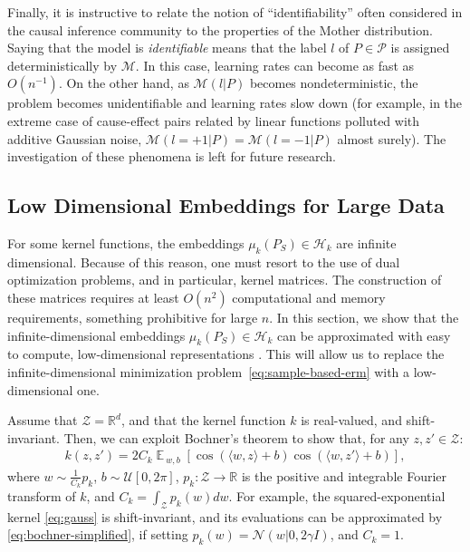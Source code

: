 \documentclass{article}
\DeclareMathOperator*{\E}{\mathbb{E}\,}
\renewcommand{\P}{\mathcal{P}}
\renewcommand{\H}{\mathcal{H}}
\newcommand{\U}{\mathcal{U}}
\newcommand{\M}{\mathscr{M}}
\newcommand{\Z}{\mathcal{Z}}
\newcommand{\N}{\mathcal{N}}
\newcommand{\R}{\mathbb{R}}
\begin{document}
Finally, it is instructive to relate the notion of ``identifiability'' often
considered in the causal inference community \citep{Pearl00} to the properties
of the Mother distribution.  Saying that the model is \emph{identifiable} means
that the label $l$ of $P\in\P$ is assigned deterministically by $\M$.  In this
case, learning rates can become as fast as $O(n^{-1})$.  On the other hand, as
$\M(l|P)$ becomes nondeterministic, the problem becomes unidentifiable and
learning rates slow down (for example, in the extreme case of cause-effect pairs related
by linear functions polluted with additive Gaussian noise, $\M(l=+1|P) =
\M(l=-1|P)$ almost surely). The investigation of these phenomena is left
for future research.

\subsection{Low Dimensional Embeddings for Large Data}\label{sec:random}

For some kernel functions, the embeddings $\mu_k(P_S)\in\H_k$
are infinite dimensional.  Because of this reason, one must resort to the use
of dual optimization problems, and in particular, kernel matrices.  The
construction of these matrices requires at least $O(n^2)$ computational and
memory requirements, something prohibitive for large $n$.  In this section, we
show that the infinite-dimensional embeddings $\mu_k(P_S)\in\H_k$ can be
approximated with easy to compute, low-dimensional representations
\citep{Rahimi07,Rahimi09}.  This will allow us to replace the
infinite-dimensional minimization problem~\eqref{eq:sample-based-erm} with a
low-dimensional one.

Assume that $\Z = \R^d$, and that the kernel function $k$ is
real-valued, and shift-invariant. Then, we can exploit Bochner's theorem
\citep{Rudin62} to show that, for any $z,z'\in \Z$:
\begin{align}
\label{eq:bochner-simplified}
k(z,z')
\!=
2C_k\!\E_{w,b}\!\left[\cos(\langle w, z\rangle\!+b)\cos(\langle w, z'\rangle\!+b)\right],
\end{align}
where $w \sim \frac{1}{C_k}p_k$, $b \sim \U[0,2\pi]$, $p_k\colon\Z\to\R$ is the
positive and integrable Fourier transform of $k$, and $C_k=\int_{\Z}p_k(w)dw$.
For example, the squared-exponential kernel \eqref{eq:gauss} is
shift-invariant, and its evaluations can be approximated by
\eqref{eq:bochner-simplified}, if setting $p_k (w) = \N(w|0,2\gamma I)$, and
$C_k=1$.  
\end{document}
